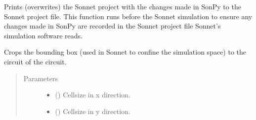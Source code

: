 \documentclass[letterpaper,10pt,english,openany]{sphinxmanual}
\begin{document}
\begin{fulllineitems}
\begin{fulllineitems}
%
\begin{sphinxVerbatim}[commandchars=\\\{\}]
 
\end{sphinxVerbatim}

\end{fulllineitems}


\begin{fulllineitems}
\label{\detokenize{source/sonpy:sonpy.sonnet.printProject}}
Prints (overwrites) the Sonnet project with the changes made in SonPy to the Sonnet project file. This function runs before the Sonnet simulation to ensure any changes made in SonPy are recorded in the Sonnet project file Sonnet’s simulation software reads.

\end{fulllineitems}


\begin{fulllineitems}
\label{\detokenize{source/sonpy:sonpy.sonnet.cropBox}}
Crops the bounding box (used in Sonnet to confine the simulation space) to the circuit of the circuit.
\begin{quote}\begin{description}
\item[{Parameters}] \leavevmode\begin{itemize}
\item {} 
 () \textendash{} Cellsize in x direction.

\item {} 
 () \textendash{} Cellsize in y direction.

\end{itemize}

\end{description}\end{quote}

\end{fulllineitems}



\end{fulllineitems}
\end{document}
